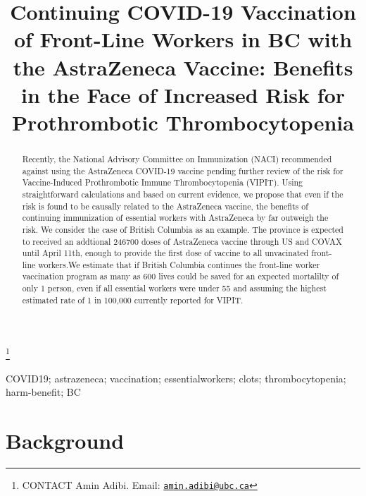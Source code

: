 \documentclass[]{interact}
\theoremstyle{plain}%
\theoremstyle{definition}
\theoremstyle{remark}
\begin{document}

\title{Continuing COVID-19 Vaccination of Front-Line Workers in BC with
the AstraZeneca Vaccine: Benefits in the Face of Increased Risk for
Prothrombotic Thrombocytopenia}


\author{
}

\thanks{CONTACT Amin
Adibi. Email: \href{mailto:amin.adibi@ubc.ca}{\nolinkurl{amin.adibi@ubc.ca}}}

\maketitle

\begin{abstract}
Recently, the National Advisory Committee on Immunization (NACI)
recommended against using the AstraZeneca COVID-19 vaccine pending
further review of the risk for Vaccine-Induced Prothrombotic Immune
Thrombocytopenia (VIPIT). Using straightforward calculations and based
on current evidence, we propose that even if the risk is found to be
causally related to the AstraZeneca vaccine, the benefits of continuing
immunization of essential workers with AstraZeneca by far outweigh the
risk. We consider the case of British Columbia as an example. The
province is expected to received an addtional 246700 doses of
AstraZeneca vaccine through US and COVAX until April 11th, enough to
provide the first dose of vaccine to all unvacinated front-line
workers.We estimate that if British Columbia continues the front-line
worker vaccination program as many as 600 lives could be saved for an
expected mortalilty of only 1 person, even if all essential workers were
under 55 and assuming the highest estimated rate of 1 in 100,000
currently reported for VIPIT.
\end{abstract}

\begin{keywords}
COVID19; astrazeneca; vaccination; essentialworkers; clots;
thrombocytopenia; harm-benefit; BC
\end{keywords}

\hypertarget{background}{%
\section{Background}\label{background}}
\end{document}
